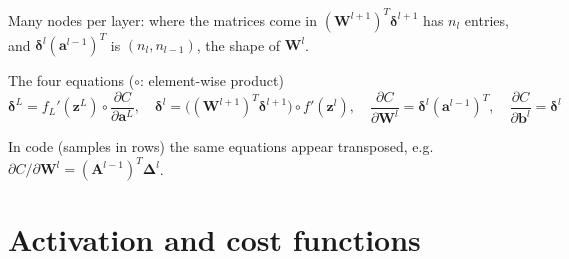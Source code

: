 \documentclass[10pt,aspectratio=169]{beamer}
\begin{document}
\begin{frame}{Many nodes per layer: where the matrices come in}
$(\bm{W}^{l+1})^{T}\bm{\delta}^{l+1}$ has $n_{l}$ entries, and
$\bm{\delta}^{l}(\bm{a}^{l-1})^{T}$ is $(n_{l},n_{l-1})$, the shape of
$\bm{W}^{l}$.
\pause
\vspace{-2pt}
\begin{block}{The four equations ($\circ$: element-wise product)}
\vspace{-8pt}
\[
  \bm{\delta}^{L}=f_{L}'(\bm{z}^{L})\circ\frac{\partial C}{\partial\bm{a}^{L}},\quad
  \bm{\delta}^{l}=\bigl((\bm{W}^{l+1})^{T}\bm{\delta}^{l+1}\bigr)\circ f'(\bm{z}^{l}),\quad
  \frac{\partial C}{\partial\bm{W}^{l}}=\bm{\delta}^{l}(\bm{a}^{l-1})^{T},\quad
  \frac{\partial C}{\partial\bm{b}^{l}}=\bm{\delta}^{l}
\]
\end{block}
\vspace{-2pt}
\footnotesize In code (samples in rows) the same equations appear transposed,
e.g.\ $\partial C/\partial\bm{W}^{l}=(\bm{A}^{l-1})^{T}\bm{\Delta}^{l}$.
\end{frame}


\section{Activation and cost functions}
\end{document}
